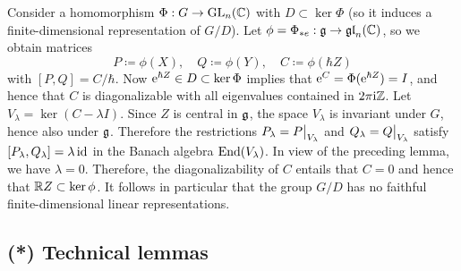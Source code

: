 \begin{example}
    Consider a homomorphism $\Phi:G\to\operatorname{GL}_n(\mathbb{C})$ with $D\subset \ker\Phi$ (so it induces a finite-dimensional representation of $G\slash D$). Let $\phi=\Phi_{\ast e}:\mathfrak{g}\to \mathfrak{gl}_n(\mathbb{C})$, so we obtain matrices
    \[P\coloneqq \phi(X), \quad Q\coloneqq \phi(Y),\quad C\coloneqq \phi(\hbar Z)\]
    with $[P,Q]=C/\hbar$. Now $\mathrm{e}^{\hbar Z}\in D\subset\ker\Phi$ implies that $\mathrm{e}^{C}=\Phi(\mathrm{e}^{\hbar Z})=I$, and hence that $C$ is diagonalizable with all eigenvalues contained in $2\pi\mathrm{i}\mathbb{Z}$. Let $V_\lambda=\ker (C-\lambda I)$. Since $Z$ is central in $\mathfrak{g}$, the space $V_\lambda$ is invariant under $G$, hence also under $\mathfrak{g}$. Therefore the restrictions $P_\lambda=\restr{P}{V_\lambda}$ and $Q_\lambda=\restr{Q}{V_\lambda}$ satisfy $[P_\lambda,Q_\lambda]=\lambda \operatorname{id}$ in the Banach algebra $\operatorname{End}(V_\lambda)$. In view of the preceding lemma, we have $\lambda=0$. Therefore, the diagonalizability of $C$ entails that $C=0$ and hence that $\mathbb{R} Z\subset \ker\phi$. It follows in particular that the group $G\slash D$ has no faithful finite-dimensional linear representations.
\end{example}











\subsection{(*) Technical lemmas}


